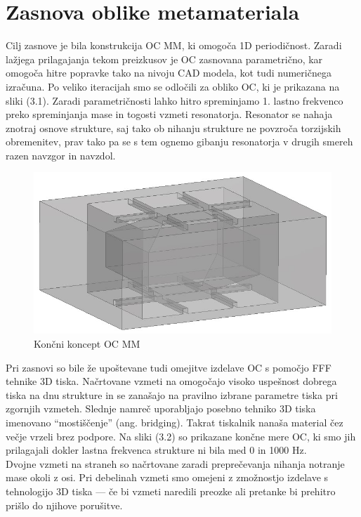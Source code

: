 \documentclass[12pt]{report}
\begin{document}
\section{Zasnova oblike metamateriala}
Cilj zasnove je bila konstrukcija \ac{OC} \ac{MM}, ki omogoča 1D periodičnost. Zaradi lažjega prilagajanja tekom preizkusov je \ac{OC} zasnovana parametrično, kar omogoča hitre popravke
tako na nivoju CAD modela, kot tudi numeričnega izračuna. Po veliko iteracijah smo se odločili za obliko \ac{OC}, ki je prikazana na sliki (3.1). Zaradi parametričnosti lahko hitro spreminjamo 1. lastno frekvenco preko 
spreminjanja mase in togosti vzmeti resonatorja. Resonator se nahaja znotraj osnove strukture, saj tako ob nihanju strukture ne povzroča torzijskih obremenitev, prav tako pa se s tem
ognemo gibanju resonatorja v drugih smereh razen navzgor in navzdol.
\begin{figure}[H]
  \centering
  \includegraphics[scale=0.6]{Images/BaseCell_v4.JPG}
  \caption{Končni koncept \ac{OC} \ac{MM}}
\end{figure}
\noindent Pri zasnovi so bile že upoštevane tudi omejitve izdelave \ac{OC} s pomočjo FFF tehnike 3D tiska. Načrtovane vzmeti na omogočajo visoko uspešnost dobrega tiska
na dnu strukture in se zanašajo na pravilno izbrane parametre tiska pri zgornjih vzmeteh. Slednje namreč uporabljajo posebno tehniko 3D tiska imenovano ``mostiščenje'' (ang. bridging). Takrat tiskalnik nanaša material čez
večje vrzeli brez podpore. Na sliki (3.2) so prikazane končne mere \ac{OC}, ki smo jih prilagajali dokler lastna frekvenca strukture ni bila med 0 in 1000 Hz.
\\
Dvojne vzmeti na straneh so načrtovane zaradi preprečevanja nihanja notranje mase okoli z osi. Pri debelinah vzmeti smo omejeni z zmožnostjo izdelave s tehnologijo 3D tiska --- če bi
vzmeti naredili preozke ali pretanke bi prehitro prišlo do njihove porušitve.
\end{document}
